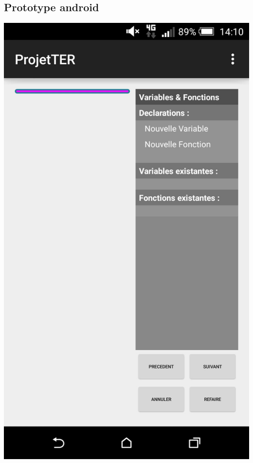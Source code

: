 \documentclass[a4paper]{article}
\begin{document}
\subsection{Prototype android}
\begin{center}
\includegraphics[scale=0.1]{img/menu_variableFonctions.jpg}

\end{center}
\end{document}
